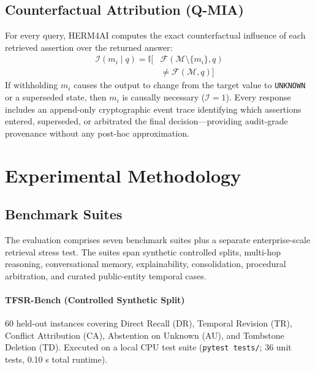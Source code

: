 \documentclass[11pt,a4paper,twocolumn]{article}
\newcommand{\herm}{\textsc{HERM4AI}}
\begin{document}
\subsection{Counterfactual Attribution (Q-MIA)}
\label{sec:qmia}

For every query, \herm{} computes the exact counterfactual influence
of each retrieved assertion over the returned answer:
\begin{equation}
\begin{aligned}
\mathcal{I}(m_i \mid q) = \mathbb{I}\!\Big[
&\mathcal{F}(\mathcal{M} \setminus \{m_i\}, q)\\
&\ne \mathcal{F}(\mathcal{M}, q)
\Big]
\end{aligned}
\label{eq:qmia}
\end{equation}
If withholding $m_i$ causes the output to change from the target value
to \texttt{UNKNOWN} or a superseded state, then $m_i$ is causally
necessary ($\mathcal{I} = 1$).  Every response includes an append-only
cryptographic event trace identifying which assertions entered, superseded,
or arbitrated the final decision---providing audit-grade provenance
without any post-hoc approximation.

\section{Experimental Methodology}
\label{sec:experiments}

\subsection{Benchmark Suites}
\label{sec:benchmarks}

The evaluation comprises seven benchmark suites plus a separate
enterprise-scale retrieval stress test. The suites span synthetic
controlled splits, multi-hop reasoning, conversational memory,
explainability, consolidation, procedural arbitration, and curated
public-entity temporal cases.

\paragraph{TFSR-Bench (Controlled Synthetic Split)}
60 held-out instances covering Direct Recall (DR), Temporal Revision
(TR), Conflict Attribution (CA), Abstention on Unknown (AU), and
Tombstone Deletion (TD).  Executed on a local CPU test suite
(\texttt{pytest tests/}; 36 unit tests, 0.10 s total runtime).
\end{document}
